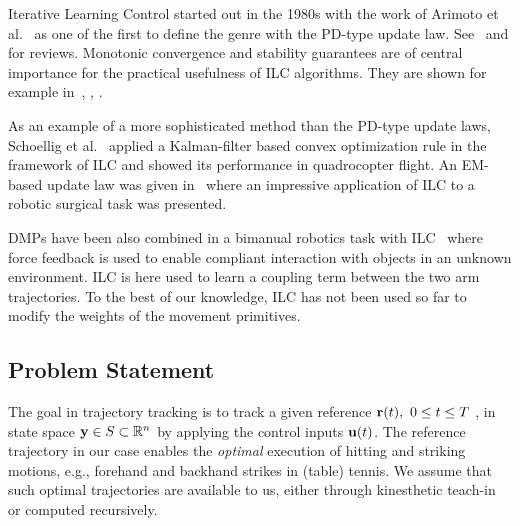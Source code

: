 Iterative Learning Control started out in the 1980s with the work of Arimoto et al.~\cite{Arimoto84} as one of the first to define the genre with the PD-type update law. See~\cite{Bristow06} and \cite{Moore99} for reviews. Monotonic convergence and stability guarantees are of central importance for the practical usefulness of ILC algorithms. They are shown for example in~\cite{Bristow06}, \cite{Norrloef02}, \cite{Longman2000}.

As an example of a more sophisticated method than the PD-type update laws, Schoellig et al.~\cite{Schoellig12} applied a Kalman-filter based convex optimization rule in the framework of ILC and showed its performance in quadrocopter flight. An EM-based update law was given in~\cite{Berg10} where an impressive application of ILC to a robotic surgical task was presented.

DMPs have been also combined in a bimanual robotics task with ILC~\cite{Gams13} where force feedback is used to enable compliant interaction with objects in an unknown environment. ILC is here used to learn a coupling term between the two arm trajectories. To the best of our knowledge, ILC has not been used so far to modify the weights of the movement primitives.

\subsection{Problem Statement}\label{problemStatement}

The goal in trajectory tracking is to track a given reference $\boldsymbol{\mathrm{r}}(t), \ 0 \leq t \leq T \ $, in state space $\boldsymbol{\mathrm{y}} \in S \subset \mathbb{R}^{n}$ by applying the control inputs $\boldsymbol{\mathrm{u}}(t)$. The reference trajectory in our case enables the \emph{optimal} execution of hitting and striking motions, e.g., forehand and backhand strikes in (table) tennis. We assume that such optimal trajectories are available to us, either through kinesthetic teach-in or computed recursively.

